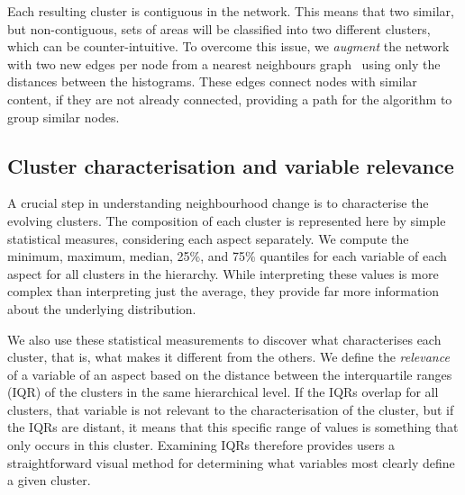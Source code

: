 Each resulting cluster is contiguous in the network. This means that two
similar, but non-contiguous, sets of areas will be classified into two different
clusters, which can be counter-intuitive. To overcome this issue, we
\emph{augment} the network with two new edges per node from a nearest neighbours
graph~\citep{scikit-learn} using only the distances between the histograms.
These edges connect nodes with similar content, if they are not already
connected, providing a path for the algorithm to group similar nodes.


\subsection{Cluster characterisation and variable relevance}
\label{sec:relevance}
A crucial step in understanding neighbourhood change is to characterise the
evolving clusters.  The composition of each cluster is represented here by
simple statistical measures, considering each aspect separately. We compute the
minimum, maximum, median, 25\%, and 75\% quantiles for each variable of each
aspect for all clusters in the hierarchy. While interpreting these values is
more complex than interpreting just the average, they provide far more
information about the underlying distribution.


We also use these statistical measurements to discover what characterises each
cluster, that is, what makes it different from the others.  We define the
\emph{relevance} of a variable of an aspect based on the distance between the
interquartile ranges (IQR) of the clusters in the same hierarchical level. If
the IQRs overlap for all clusters, that variable is not relevant to the
characterisation of the cluster, but if the IQRs are distant, it means that this
specific range of values is something that only occurs in this cluster.
Examining IQRs therefore provides users a straightforward visual method for
determining what variables most clearly define a given cluster.


